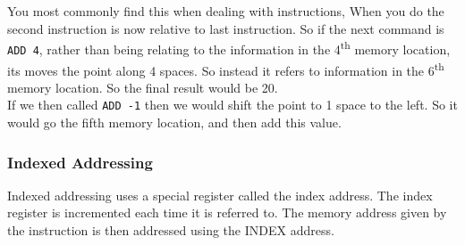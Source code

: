 				
			
			You most commonly find this when dealing with  instructions, 
			When you do the second instruction is now relative to last instruction. So if the next command is \texttt{ADD 4}, rather than being relating to the information in the 4\textsuperscript{th} memory location, its moves the point along 4 spaces. So instead it refers to information in the 6\textsuperscript{th} memory location. So the final result would be 20. \\
			
			If we then called \texttt{ADD -1} then we would shift the point to 1 space to the left. So it would go the fifth memory location, and then add this value.
			
			\begin{figure}[h!]
				\begin{center}
				\end{center}
			\end{figure}
			
			\subsubsection{Indexed Addressing}
			
			Indexed addressing uses a special register called the index address. The index register is incremented each time it is referred to. The memory address given by the instruction is then addressed using the INDEX address. 
			
